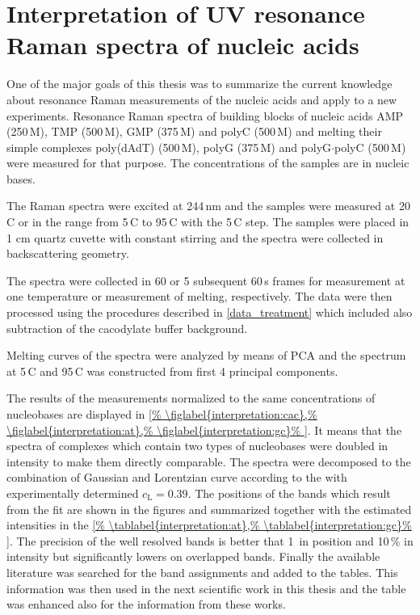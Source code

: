 \section{Interpretation of UV resonance Raman spectra of nucleic acids}

\newlength{\assignwnl}
\settowidth{\assignwnl}{0000}
\newlength{\assignwnil}
\settowidth{\assignwnil}{(000)}
\newlength{\assignwnspl}
\setlength{\assignwnspl}{0.2cm}
\newlength{\assigntabrowindent}
\setlength{\assigntabrowindent}{.7em}


One of the major goals of this thesis was to summarize the current knowledge
about resonance Raman measurements of the nucleic acids and apply to a new
experiments.
Resonance Raman spectra of building blocks of nucleic acids AMP (250\,M),
TMP (500\,M), GMP (375\,M) and polyC (500\,M) and melting their
simple complexes poly(dAdT) (500\,M), polyG (375\,M) and
polyG$\cdot$polyC (500\,M) were measured for that purpose.
The concentrations of the samples are in nucleic bases.

The Raman spectra were excited at 244\,nm and the samples were measured at
20\,\textdegree{}C or in the range from 5\,\textdegree{}C to 95\,\textdegree{}C
with the 5\,\textdegree{}C step. The samples were placed in 1 cm quartz cuvette
with constant stirring and the spectra were collected in backscattering
geometry.

The spectra were collected in 60 or 5 subsequent 60\,s frames for measurement
at one temperature or measurement of melting, respectively.
The data were then processed using the procedures described in
\cref{data_treatment}
which included also subtraction of the cacodylate buffer background.

Melting curves of the spectra were analyzed by means of PCA and the spectrum
at 5\,\textdegree{}C and 95\,\textdegree{}C was constructed from first 4
principal components.

The results of the measurements normalized to the same concentrations of
nucleobases are displayed in
\cref{%
	\figlabel{interpretation:cac},%
	\figlabel{interpretation:at},%
	\figlabel{interpretation:gc}%
}.
It means that the spectra of complexes which contain two types of nucleobases
were doubled in intensity to make them directly comparable.
The spectra were decomposed to the combination of Gaussian and Lorentzian curve
according to the
with experimentally determined
$c_\text{L} = 0.39$.
The positions of the bands which result from the fit are shown in the figures
and summarized together with the estimated intensities in the
\cref{%
	\tablabel{interpretation:at},%
	\tablabel{interpretation:gc}%
}.
The precision of the well resolved bands is better that 1\,\icm{} in position
and 10\,\% in intensity but significantly lowers on overlapped bands.
Finally the available literature was searched for the band assignments and
added to the tables.
This information was then used in the next scientific work in this thesis and
the table was enhanced also for the information from these works.


